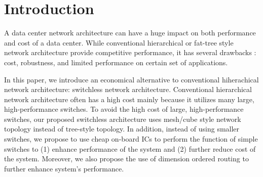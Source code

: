 \section{Introduction}
\label{sec:intro}
A data center network architecture can have a huge impact on both performance and cost of a data center. While conventional hierarchical or fat-tree style network architecture provide competitive performance, it has several drawbacks : cost, robustness, and limited performance on certain set of applications. 

In this paper, we introduce an economical alternative to conventional hiherachical network architecture: switchless network architecture. Conventional hierarchical network architecture often has a high cost mainly because it utilizes many large, high-performance switches. To avoid the high cost of large, high-performance switches, our proposed switchless architecture uses mesh/cube style network topology instead of tree-style topology. In addition, instead of using smaller switches, we propose to use cheap on-board ICs to perform the function of simple switches to (1) enhance performance of the system and (2) further reduce cost of the system. Moreover, we also propose the use of dimension ordered routing to further enhance system's performance.